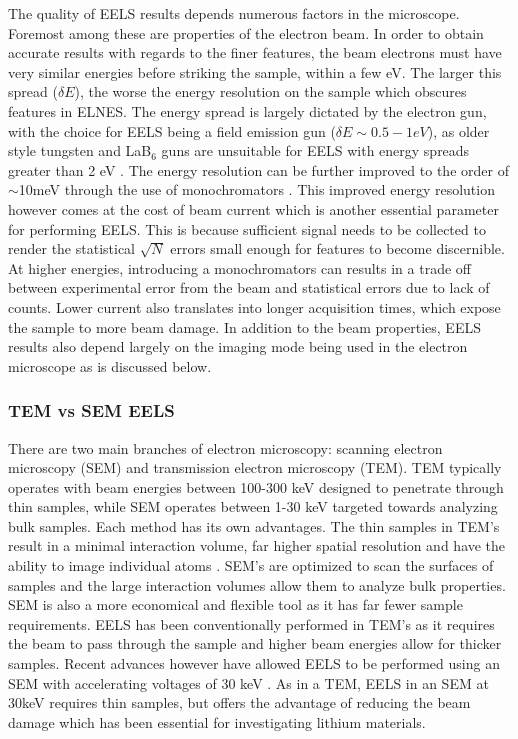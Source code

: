 The quality of EELS results depends numerous factors in the microscope.  Foremost among these are properties of the electron beam.  In order to obtain accurate results with regards to the finer features, the beam electrons must have very similar energies before striking the sample, within a few eV.  The larger this spread ($ \delta E $), the worse the energy resolution on the sample which obscures features in ELNES.  The energy spread is largely dictated by the electron gun, with the choice for EELS being a field emission gun ($\delta E \sim 0.5-1eV$), as older style tungsten and LaB$_6$ guns are unsuitable for EELS with energy spreads greater than 2 eV \cite{reimer_transmission_2008}.  The energy resolution can be further improved to the order of $\sim$10meV through the use of monochromators \cite{hachtel_exploring_2018}.  This improved energy resolution however comes at the cost of beam current which is another essential parameter for performing EELS.  This is because sufficient signal needs to be collected to render the statistical $\sqrt{N}$ errors small enough for features to become discernible.  At higher energies, introducing a monochromators can results in a trade off between experimental error from the beam and statistical errors due to lack of counts.  Lower current also translates into longer acquisition times, which expose the sample to more beam damage.  In addition to the beam properties, EELS results also depend largely on the imaging mode being used in the electron microscope as is discussed below.


\subsubsection{TEM vs SEM EELS}
There are two main branches of electron microscopy: scanning electron microscopy (SEM) and transmission electron microscopy (TEM).  TEM typically operates with beam energies between 100-300 keV designed to penetrate through thin samples, while SEM operates between 1-30 keV targeted towards analyzing bulk samples.  Each method has its own advantages.  The thin samples in TEM's result in a minimal interaction volume, far higher spatial resolution and have the ability to image individual atoms \cite{hansen_atomic-resolution_2001}. SEM's are optimized to scan the surfaces of samples and the large interaction volumes allow them to analyze bulk properties.  SEM is also a more economical and flexible tool as it has far fewer sample requirements.   EELS has been conventionally performed in TEM's as it requires the beam to pass through the sample and higher beam energies allow for thicker samples. Recent advances however have allowed EELS to be performed using an SEM with accelerating voltages of 30 keV \cite{SU_9000}.  As in a TEM, EELS in an SEM at 30keV requires thin samples, but offers the advantage of reducing the beam damage which has been essential for investigating lithium materials. 



